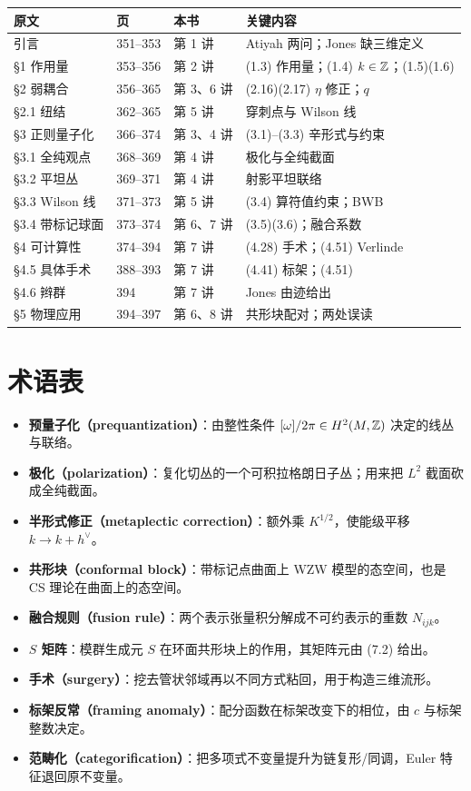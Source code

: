 \begin{center}
\small
\begin{tabular}{@{}p{3.4cm}p{1.6cm}p{2.4cm}p{4.4cm}@{}}
\toprule
原文 & 页 & 本书 & 关键内容 \\
\midrule
引言 & 351–353 & 第 1 讲 & Atiyah 两问；Jones 缺三维定义 \\
\S1 作用量 & 353–356 & 第 2 讲 & (1.3) 作用量；(1.4) $k\in\mathbb{Z}$；(1.5)(1.6) \\
\S2 弱耦合 & 356–365 & 第 3、6 讲 & (2.16)(2.17) $\eta$ 修正；$q$ \\
\S2.1 纽结 & 362–365 & 第 5 讲 & 穿刺点与 Wilson 线 \\
\S3 正则量子化 & 366–374 & 第 3、4 讲 & (3.1)–(3.3) 辛形式与约束 \\
\S3.1 全纯观点 & 368–369 & 第 4 讲 & 极化与全纯截面 \\
\S3.2 平坦丛 & 369–371 & 第 4 讲 & 射影平坦联络 \\
\S3.3 Wilson 线 & 371–373 & 第 5 讲 & (3.4) 算符值约束；BWB \\
\S3.4 带标记球面 & 373–374 & 第 6、7 讲 & (3.5)(3.6)；融合系数 \\
\S4 可计算性 & 374–394 & 第 7 讲 & (4.28) 手术；(4.51) Verlinde \\
\S4.5 具体手术 & 388–393 & 第 7 讲 & (4.41) 标架；(4.51) \\
\S4.6 辫群 & 394 & 第 7 讲 & Jones 由迹给出 \\
\S5 物理应用 & 394–397 & 第 6、8 讲 & 共形块配对；两处误读 \\
\bottomrule
\end{tabular}
\end{center}

\section{术语表}

\begin{itemize}[leftmargin=*]
  \item \textbf{预量子化（prequantization）}：由整性条件 $[\omega]/2\pi\in H^2(M,\mathbb{Z})$ 决定的线丛与联络。
  \item \textbf{极化（polarization）}：复化切丛的一个可积拉格朗日子丛；用来把 $L^2$ 截面砍成全纯截面。
  \item \textbf{半形式修正（metaplectic correction）}：额外乘 $K^{1/2}$，使能级平移 $k\to k+h^\vee$。
  \item \textbf{共形块（conformal block）}：带标记点曲面上 WZW 模型的态空间，也是 CS 理论在曲面上的态空间。
  \item \textbf{融合规则（fusion rule）}：两个表示张量积分解成不可约表示的重数 $N_{ijk}$。
  \item \textbf{$S$ 矩阵}：模群生成元 $S$ 在环面共形块上的作用，其矩阵元由 (7.2) 给出。
  \item \textbf{手术（surgery）}：挖去管状邻域再以不同方式粘回，用于构造三维流形。
  \item \textbf{标架反常（framing anomaly）}：配分函数在标架改变下的相位，由 $c$ 与标架整数决定。
  \item \textbf{范畴化（categorification）}：把多项式不变量提升为链复形/同调，Euler 特征退回原不变量。
\end{itemize}

